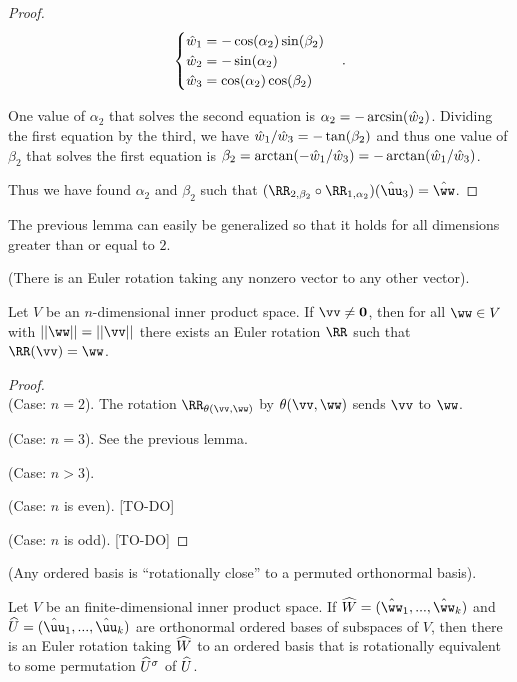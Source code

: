 \begin{proof}
    \begin{align*}
        \begin{cases}
            \hat{w}_1 = -\cos(\alpha_2) \sin(\beta_2) \\
            \hat{w}_2 = -\sin(\alpha_2) \\
            \hat{w}_3 = \cos(\alpha_2) \cos(\beta_2)
        \end{cases}.
    \end{align*}

    One value of $\alpha_2$ that solves the second equation is $\alpha_2 = -\arcsin(\hat{w}_2)$. Dividing the first equation by the third, we have $\hat{w}_1/\hat{w}_3 = -\tan(\beta_2)$ and thus one value of $\beta_2$ that solves the first equation is $\beta_2 = \arctan(-\hat{w}_1/\hat{w}_3) = -\arctan(\hat{w}_1/\hat{w}_3)$.

    Thus we have found $\alpha_2$ and $\beta_2$ such that $(\RR_{2, \beta_2} \circ \RR_{1, \alpha_2})(\huu_3) = \hww$.
\end{proof}

The previous lemma can easily be generalized so that it holds for all dimensions greater than or equal to $2$.

\begin{lemma}
    (There is an Euler rotation taking any nonzero vector to any other vector).
    
    Let $V$ be an $n$-dimensional inner product space. If $\vv \neq \mathbf{0}$, then for all $\ww \in V$ with $||\ww|| = ||\vv||$ there exists an Euler rotation $\RR$ such that $\RR(\vv) = \ww$.
\end{lemma}

\begin{proof}
    \mbox{} \\

    (Case: $n = 2$). The rotation $\RR_{\theta(\vv, \ww)}$ by $\theta(\vv, \ww)$ sends $\vv$ to $\ww$.
    
    (Case: $n = 3$). See the previous lemma.
    
    (Case: $n > 3$).
    
    \indent (Case: $n$ is even). [TO-DO]
    
    \indent (Case: $n$ is odd). [TO-DO]
\end{proof}

\begin{theorem}
\label{ch::lin_alg::thm::n_rot_acts_on_orthonormal_basis}
     (Any ordered basis is ``rotationally close'' to a permuted orthonormal basis).
     
     Let $V$ be an finite-dimensional inner product space. If $\hW = (\hww_1, ..., \hww_k)$ and $\hU = (\huu_1, ..., \huu_k)$ are orthonormal ordered bases of subspaces of $V$, then there is an Euler rotation taking $\widehat{W}$ to an ordered basis that is rotationally equivalent to some permutation $\widehat{U}^\sigma$ of $\widehat{U}$. 
\end{theorem}


